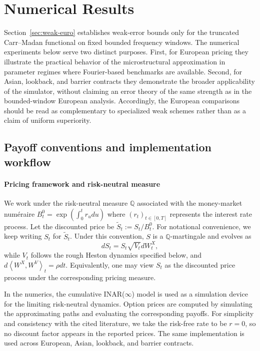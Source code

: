 \documentclass[letterpaper]{article}
\numberwithin{equation}{section}
\theoremstyle{definition}
\theoremstyle{remark}
\begin{document}

\section{Numerical Results}\label{sec:numerical}

Section~\ref{sec:weak-euro} establishes weak-error bounds only for the truncated Carr--Madan functional on fixed bounded frequency windows. The numerical experiments below serve two distinct purposes. First, for European pricing they illustrate the practical behavior of the microstructural approximation in parameter regimes where Fourier-based benchmarks are available. Second, for Asian, lookback, and barrier contracts they demonstrate the broader applicability of the simulator, without claiming an error theory of the same strength as in the bounded-window European analysis. Accordingly, the European comparisons should be read as complementary to specialized weak schemes rather than as a claim of uniform superiority.

\subsection{Payoff conventions and implementation workflow}
\label{subsec:numerical-workflow}

\paragraph{Pricing framework and risk-neutral measure}
We work under the risk-neutral measure $\mathbb Q$ associated with the money-market num\'eraire $B_t^{0}=\exp\left(\int_0^t r_udu\right)$ where $(r_t)_{t\in[0,T]}$ represents the interest rate process.
Let the discounted price be $\tilde S_t := S_t/B_t^0$. For notational convenience, we keep writing $S_t$ for $\tilde S_t$.
Under this convention, $S$ is a $\mathbb Q$-martingale and evolves as
\[
dS_t = S_t \sqrt{V_t} dW_t^X,
\]
while $V_t$ follows the rough Heston dynamics specified below, and $d\left\langle W^X,W^V\right\rangle_t=\rho dt$.
Equivalently, one may view $S_t$ as the discounted price process under the corresponding pricing measure.

In the numerics, the cumulative INAR($\infty$) model is used as a simulation device for the limiting risk-neutral dynamics. Option prices are computed by simulating the approximating paths and evaluating the corresponding payoffs. For simplicity and consistency with the cited literature, we take the risk-free rate to be $r=0$, so no discount factor appears in the reported prices. The same implementation is used across European, Asian, lookback, and barrier contracts.
\end{document}
